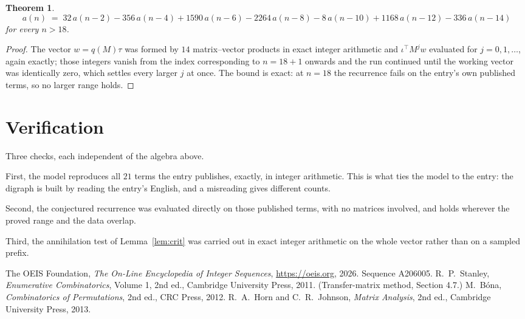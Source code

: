 \documentclass[11pt,a4paper]{article}
\theoremstyle{plain}
\newtheorem{theorem}{Theorem}
\theoremstyle{definition}
\begin{document}
\begin{theorem}
\[
a(n)\;=\;32\,a(n-2) - 356\,a(n-4) + 1590\,a(n-6) - 2264\,a(n-8) - 8\,a(n-10) + 1168\,a(n-12) - 336\,a(n-14)
\]
for every $n>18$.
\end{theorem}

\begin{proof}
The vector $w=q(M)\tau$ was formed by $14$ matrix--vector products in exact integer
arithmetic and $\iota^{\!\top}M^{j}w$ evaluated for $j=0,1,\dots$, again exactly; those
integers vanish from the index corresponding to $n=18+1$ onwards and the run continued
until the working vector was identically zero, which settles every larger $j$ at once. The bound is exact: at $n=18$ the recurrence fails on the entry's own published terms, so no larger range holds.
\end{proof}

\section{Verification}

Three checks, each independent of the algebra above.

First, the model reproduces all $21$ terms the entry publishes, exactly, in integer
arithmetic. This is what ties the model to the entry: the digraph is built by reading the
entry's English, and a misreading gives different counts.

Second, the conjectured recurrence was evaluated directly on those published terms, with no
matrices involved, and holds wherever the proved range and the data overlap.

Third, the annihilation test of Lemma~\ref{lem:crit} was carried out in exact integer
arithmetic on the whole vector rather than on a sampled prefix.

\begin{thebibliography}{9}
 The OEIS Foundation, \emph{The On-Line Encyclopedia of Integer
Sequences}, \url{https://oeis.org}, 2026. Sequence A206005.
 R.~P.~Stanley, \emph{Enumerative Combinatorics}, Volume 1, 2nd ed.,
Cambridge University Press, 2011. (Transfer-matrix method, Section 4.7.)
 M.~B\'ona, \emph{Combinatorics of Permutations}, 2nd ed., CRC
Press, 2012.
 R.~A.~Horn and C.~R.~Johnson, \emph{Matrix Analysis}, 2nd ed., Cambridge
University Press, 2013.
\end{thebibliography}
\end{document}

